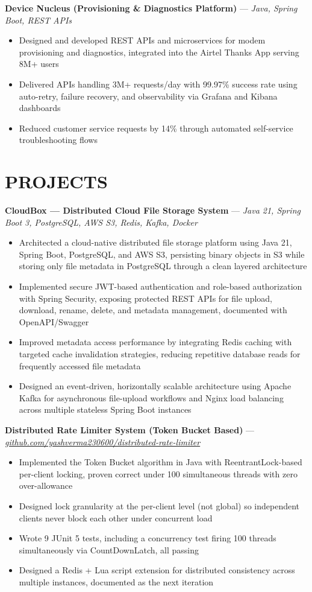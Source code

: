 \documentclass[10.5pt,letterpaper]{article}
\newcommand{\proj}[2]{\vspace{3pt}\textbf{#1} \hspace{0.3em}---\hspace{0.3em} \textit{#2}\par\vspace{-1pt}}
\newenvironment{bul}{\begin{itemize}[leftmargin=2.2em,itemsep=1pt,topsep=1pt,parsep=0pt,label=\textbullet]}{\end{itemize}}
\begin{document}
\proj{Device Nucleus (Provisioning \& Diagnostics Platform)}{Java, Spring Boot, REST APIs}
\begin{bul}
\item Designed and developed REST APIs and microservices for modem provisioning and diagnostics, integrated into the Airtel Thanks App serving 8M+ users
\item Delivered APIs handling 3M+ requests/day with 99.97\% success rate using auto-retry, failure recovery, and observability via Grafana and Kibana dashboards
\item Reduced customer service requests by 14\% through automated self-service troubleshooting flows
\end{bul}

\section{PROJECTS}
\proj{CloudBox --- Distributed Cloud File Storage System}{Java 21, Spring Boot 3, PostgreSQL, AWS S3, Redis, Kafka, Docker}
\begin{bul}
\item Architected a cloud-native distributed file storage platform using Java 21, Spring Boot, PostgreSQL, and AWS S3, persisting binary objects in S3 while storing only file metadata in PostgreSQL through a clean layered architecture
\item Implemented secure JWT-based authentication and role-based authorization with Spring Security, exposing protected REST APIs for file upload, download, rename, delete, and metadata management, documented with OpenAPI/Swagger
\item Improved metadata access performance by integrating Redis caching with targeted cache invalidation strategies, reducing repetitive database reads for frequently accessed file metadata
\item Designed an event-driven, horizontally scalable architecture using Apache Kafka for asynchronous file-upload workflows and Nginx load balancing across multiple stateless Spring Boot instances
\end{bul}

\proj{Distributed Rate Limiter System (Token Bucket Based)}{\href{https://github.com/yashverma230600/distributed-rate-limiter}{github.com/yashverma230600/distributed-rate-limiter}}
\begin{bul}
\item Implemented the Token Bucket algorithm in Java with ReentrantLock-based per-client locking, proven correct under 100 simultaneous threads with zero over-allowance
\item Designed lock granularity at the per-client level (not global) so independent clients never block each other under concurrent load
\item Wrote 9 JUnit 5 tests, including a concurrency test firing 100 threads simultaneously via CountDownLatch, all passing
\item Designed a Redis + Lua script extension for distributed consistency across multiple instances, documented as the next iteration
\end{bul}
\end{document}
